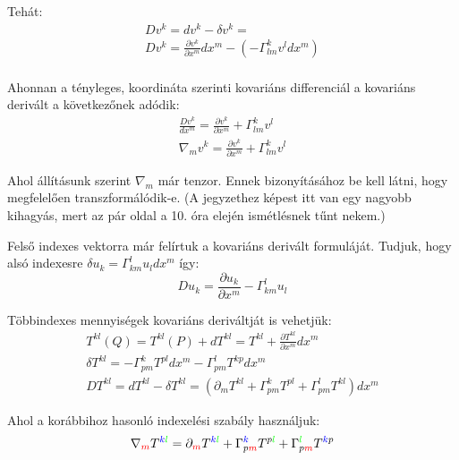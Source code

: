\documentclass[a4paper,12pt]{article}
\begin{document}
\par Tehát:
\begin{align*}
    Dv^{k} = dv^{k} - \delta v^{k} = \\
    Dv^{k} = \frac{\partial v^{k}}{\partial x^{m}}dx^{m} - ( -\Gamma_{lm}^{k}v^{l}dx^{m} ) \\
\end{align*}
\par Ahonnan a tényleges, koordináta szerinti kovariáns differenciál a kovariáns derivált a következőnek adódik:
\begin{gather*}
    \frac{Dv^{k}}{dx^{m}} = \frac{\partial v^{k}}{\partial x^{m}} + \Gamma_{lm}^{k}v^{l} \\
    \nabla_{m}v^{k} = \frac{\partial v^{k}}{\partial x^{m}} + \Gamma_{lm}^{k}v^{l}
\end{gather*}
\par Ahol állításunk szerint $\nabla_{m}$ már tenzor. Ennek bizonyításához be kell látni, hogy megfelelően transzformálódik-e. (A jegyzethez képest itt van egy nagyobb kihagyás, mert az pár oldal a 10. óra elején ismétlésnek tűnt nekem.)
\par Felső indexes vektorra már felírtuk a kovariáns derivált formuláját. Tudjuk, hogy alsó indexesre $\delta u_{k} = \Gamma_{km}^{l}u_{l}dx^{m}$ így:
\begin{equation*}
    Du_{k} = \frac{\partial u_{k}}{\partial x^{m}} - \Gamma_{km}^{l}u_{l}
\end{equation*}
\par Többindexes mennyiségek kovariáns deriváltját is vehetjük:
\begin{gather*}
    T^{kl}(Q) = T^{kl}(P) + dT^{kl} = T^{kl} + \frac{\partial T^{kl}}{\partial x^{m}}dx^{m} \\
    \delta T^{kl} = -\Gamma_{pm}^{k}T^{pl}dx^{m} - \Gamma_{pm}^{l}T^{kp}dx^{m} \\
    DT^{kl} = dT^{kl} - \delta T^{kl} = (\partial_{m}T^{kl} + \Gamma_{pm}^{k}T^{pl} + \Gamma_{pm}^{l}T^{kl})dx^{m}
\end{gather*}
\par Ahol a korábbihoz hasonló indexelési szabály használjuk:
\begin{equation*}
    \nabla_{\textcolor{red}{m}}T^{\textcolor{blue}{k}\textcolor{green}{l}} = \partial_{\textcolor{red}{m}}T^{\textcolor{blue}{k}\textcolor{green}{l}} + \Gamma_{p\textcolor{red}{m}}^{\textcolor{blue}{k}}T^{p\textcolor{green}{l}} + \Gamma_{p\textcolor{red}{m}}^{\textcolor{green}{l}}T^{\textcolor{blue}{k}p}
\end{equation*}
\end{document}
